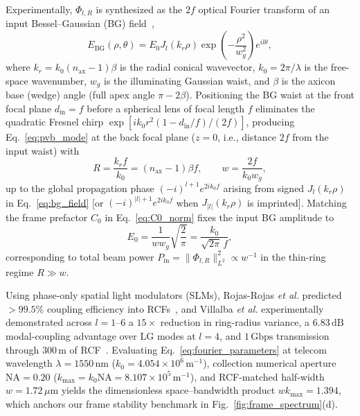 \documentclass[aps,pra,reprint,amsmath,amssymb,floatfix,longbibliography]{revtex4-2}
\providecommand{\abs}[1]{\lvert#1\rvert}
\providecommand{\norm}[1]{\lVert#1\rVert}
\begin{document}
Experimentally, $\Phi_{l,R}$ is synthesized as the $2f$ optical Fourier transform of an input Bessel--Gaussian (BG) field~\cite{Gori1987,Vaity2015},
\begin{equation}
E_{\mathrm{BG}}(\rho,\theta) = E_0 J_l(k_r\rho)\exp\!\left(-\frac{\rho^2}{w_g^2}\right) e^{il\theta},
\label{eq:bg_field}
\end{equation}
where $k_r = k_0(n_{\mathrm{ax}}-1)\beta$ is the radial conical wavevector, $k_0 = 2\pi/\lambda$ is the free-space wavenumber, $w_g$ is the illuminating Gaussian waist, and $\beta$ is the axicon base (wedge) angle (full apex angle $\pi - 2\beta$). Positioning the BG waist at the front focal plane $d_{\mathrm{in}} = f$ before a spherical lens of focal length $f$ eliminates the quadratic Fresnel chirp $\exp[i k_0 r^2(1-d_{\mathrm{in}}/f)/(2f)]$, producing Eq.~\eqref{eq:pvb_mode} at the back focal plane ($z = 0$, i.e., distance $2f$ from the input waist) with~\cite{Vaity2015,Villalba2023}
\begin{equation}
R = \frac{k_r f}{k_0} = (n_{\mathrm{ax}}-1)\beta f, \qquad w = \frac{2f}{k_0 w_g},
\label{eq:fourier_parameters}
\end{equation}
up to the global propagation phase $(-i)^{l+1} e^{2ik_0 f}$ arising from signed $J_l(k_r\rho)$ in Eq.~\eqref{eq:bg_field} [or $(-i)^{\abs{l}+1} e^{2ik_0 f}$ when $J_{\abs{l}}(k_r\rho)$ is imprinted]. Matching the frame prefactor $C_0$ in Eq.~\eqref{eq:C0_norm} fixes the input BG amplitude to
\begin{equation}
E_0 = \frac{1}{w w_g}\sqrt{\frac{2}{\pi}} = \frac{k_0}{\sqrt{2\pi}\,f},
\label{eq:E0_scaling}
\end{equation}
corresponding to total beam power $P_{\mathrm{in}} = \norm{\Phi_{l,R}}_{L^2}^2 \propto w^{-1}$ in the thin-ring regime $R \gg w$.

Using phase-only spatial light modulators (SLMs), Rojas-Rojas \emph{et al.} predicted $>99.5\%$ coupling efficiency into RCFs~\cite{RojasRojas2021}, and Villalba \emph{et al.} experimentally demonstrated across $l = 1\text{--}6$ a $15\times$ reduction in ring-radius variance, a $6.83\,\mathrm{dB}$ modal-coupling advantage over $\mathrm{LG}$ modes at $l = 4$, and $1\,\mathrm{Gbps}$ transmission through $300\,\mathrm{m}$ of RCF~\cite{Villalba2023}. Evaluating Eq.~\eqref{eq:fourier_parameters} at telecom wavelength $\lambda = 1550\,\mathrm{nm}$ ($k_0 = 4.054\times 10^6\,\mathrm{m}^{-1}$), collection numerical aperture $\mathrm{NA} = 0.20$ ($k_{\max} = k_0\mathrm{NA} = 8.107\times 10^5\,\mathrm{m}^{-1}$), and RCF-matched half-width $w = 1.72\,\mu\mathrm{m}$ yields the dimensionless space--bandwidth product $w k_{\max} = 1.394$, which anchors our frame stability benchmark in Fig.~\ref{fig:frame_spectrum}(d).
\end{document}
